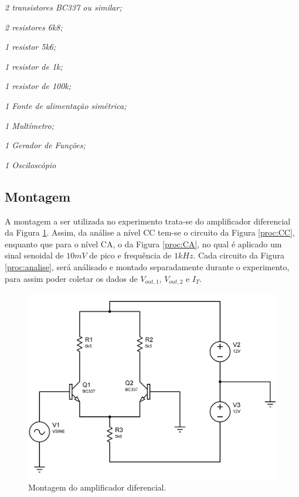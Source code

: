 \documentclass[a4paper,12pt,oneside,openany,table,xcdraw]{article}
\begin{document}
\singlespacing
\begin{itemize}
\begin{multicols}{2}
\item \emph{2 transistores BC337 ou similar;}
\item \emph{2 resistores 6k8;}
\item \emph{1 resistor 5k6;}
\item \emph{1 resistor de 1k;}
\item \emph{1 resistor de 100k;}\columnbreak

\item \emph{1 Fonte de alimentação simétrica;}
\item \emph{1 Multímetro;}
\item \emph{1 Gerador de Funções;}
\item \emph{1 Osciloscópio}
\end{multicols}

\end{itemize}
\onehalfspacing

\vspace{0.2cm}
\subsection{Montagem} %
A montagem a ser utilizada no experimento trata-se do amplificador diferencial da Figura \ref{proc:montagem}. Assim, da análise a nível CC tem-se o circuito da Figura \ref{proc:CC}, enquanto que para o nível CA, o da Figura \ref{proc:CA}, no qual é aplicado um sinal senoidal de $10 mV$ de pico e frequência de $1kHz$. Cada circuito da Figura \ref{proc:analise}, será análisado e montado separadamente durante o experimento, para assim poder coletar os dados de $V_{out, 1}$, $V_{out, 2}$ e $I_{T}$.

\vspace{0.3cm}
\begin{figure}[H]
\centering
\includegraphics[width=13cm]{montagem}
\caption{Montagem do amplificador diferencial.}
\label{proc:montagem}
\end{figure}
\vspace{0.5cm}
\end{document}
